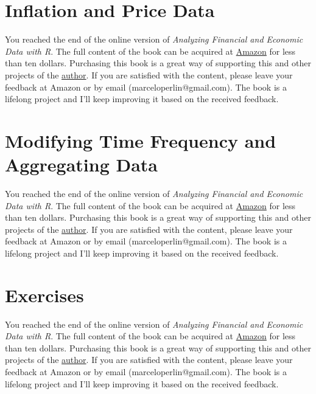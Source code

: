 \documentclass[
  12pt,
]{book}
\newenvironment{pleasebuyit}
{\begin{noteblock}
		
	} {\end{noteblock}}
\begin{document}
\hypertarget{inflation-and-price-data}{%
\section{Inflation and Price Data}\label{inflation-and-price-data}}

\begin{pleasebuyit}
You reached the end of the online version of \emph{Analyzing Financial
and Economic Data with R}. The full content of the book can be acquired
at \href{https://www.amazon.com/dp/B084LSNXMN}{Amazon} for less than ten
dollars. Purchasing this book is a great way of supporting this and
other projects of the \href{https://www.msperlin.com/}{author}. If you
are satisfied with the content, please leave your feedback at Amazon or
by email (marceloperlin@gmail.com). The book is a lifelong project and
I'll keep improving it based on the received feedback.
\end{pleasebuyit}

\hypertarget{modifying-time-frequency-and-aggregating-data}{%
\section{Modifying Time Frequency and Aggregating Data}\label{modifying-time-frequency-and-aggregating-data}}

\begin{pleasebuyit}
You reached the end of the online version of \emph{Analyzing Financial
and Economic Data with R}. The full content of the book can be acquired
at \href{https://www.amazon.com/dp/B084LSNXMN}{Amazon} for less than ten
dollars. Purchasing this book is a great way of supporting this and
other projects of the \href{https://www.msperlin.com/}{author}. If you
are satisfied with the content, please leave your feedback at Amazon or
by email (marceloperlin@gmail.com). The book is a lifelong project and
I'll keep improving it based on the received feedback.
\end{pleasebuyit}

\hypertarget{exercises-7}{%
\section{Exercises}\label{exercises-7}}

\begin{pleasebuyit}
You reached the end of the online version of \emph{Analyzing Financial
and Economic Data with R}. The full content of the book can be acquired
at \href{https://www.amazon.com/dp/B084LSNXMN}{Amazon} for less than ten
dollars. Purchasing this book is a great way of supporting this and
other projects of the \href{https://www.msperlin.com/}{author}. If you
are satisfied with the content, please leave your feedback at Amazon or
by email (marceloperlin@gmail.com). The book is a lifelong project and
I'll keep improving it based on the received feedback.
\end{pleasebuyit}
\end{document}
